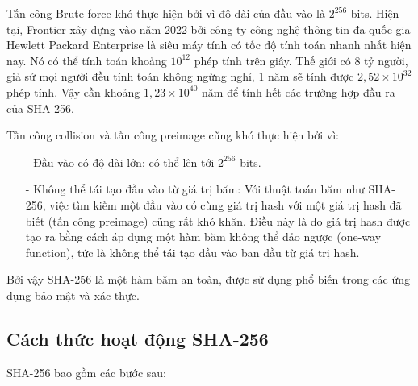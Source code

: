 Tấn công Brute force khó thực hiện bởi vì độ dài của đầu vào là $2^{256}$ bits.
Hiện tại, Frontier xây dựng vào năm 2022 bởi công ty công nghệ thông tin đa quốc gia
Hewlett Packard Enterprise là siêu máy tính có tốc độ tính toán nhanh nhất hiện nay. Nó có thể tính
toán khoảng $10^{12}$ phép tính trên giây. Thế giới có 8 tỷ người, giả sử mọi người đều tính toán
không ngừng nghỉ, 1 năm sẽ tính được $2,52 \times 10^{32}$ phép tính. Vậy cần khoảng $1,23 \times 10^{40}$ năm để tính hết các 
trường hợp đầu ra của SHA-256. 

Tấn công collision và tấn công preimage cũng khó thực hiện bởi vì:
\begin{itemize}
    \item[-] Đầu vào có độ dài lớn: có thể lên tới $2^{256}$ bits.
    \item[-] Không thể tái tạo đầu vào từ giá trị băm: Với thuật toán băm như SHA-256, 
    việc tìm kiếm một đầu vào có cùng giá trị hash với một giá trị hash đã biết (tấn công preimage) cũng rất khó khăn. Điều này là do giá trị hash được tạo ra bằng cách áp dụng một hàm băm không thể đảo ngược (one-way function), tức là không thể tái tạo đầu vào ban đầu từ giá trị hash.
\end{itemize}

Bởi vậy SHA-256 là một hàm băm an toàn, được sử dụng phổ biến trong các ứng dụng bảo mật và xác thực.

\subsection{Cách thức hoạt động SHA-256}
SHA-256 bao gồm các bước sau:

